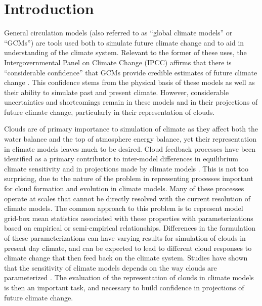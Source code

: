 \chapter{Introduction}
General circulation models (also referred to as ``global climate models'' or ``GCMs'') are tools used both to simulate future climate change and to aid in understanding of the climate system. Relevant to the former of these uses, the Intergovernmental Panel on Climate Change (IPCC) affirms that there is ``considerable confidence'' that GCMs provide credible estimates of future climate change \citep{ar4_ch8}. This confidence stems from the physical basis of these models as well as their ability to simulate past and present climate. However, considerable uncertainties and shortcomings remain in these models and in their projections of future climate change, particularly in their representation of clouds.

Clouds are of primary importance to simulation of climate as they affect both the water balance and the top of atmosphere energy balance, yet their representation in climate models leaves much to be desired. Cloud feedback processes have been identified as a primary contributor to inter-model differences in equilibrium climate sensitivity and in projections made by climate models \citep{cess_et_al_1990,colman_2003,stephens_2005,webb_et_al_2006,bony_et_al_2006,williams_and_webb_2009}. This is not too surprising, due to the nature of the problem in representing processes important for cloud formation and evolution in climate models. Many of these processes operate at scales that cannot be directly resolved with the current resolution of climate models. The common approach to this problem is to represent model grid-box mean statistics associated with these properties with parameterizations based on empirical or semi-empirical relationships. Differences in the formulation of these parameterizations can have varying results for simulation of clouds in present day climate, and can be expected to lead to different cloud responses to climate change that then feed back on the climate system. Studies have shown that the sensitivity of climate models depends on the way clouds are parameterized \citep{mitchell_et_al_1987,senior_and_mitchell_1993,le_treut_et_al_1994,fowler_and_randall_1994,ma_et_al_1994,liang_and_wang_1997,yao_and_del_genio_2002,zhang_2004,stainforth_et_al_2005,yokohata_et_al_2005}. The evaluation of the representation of clouds in climate models is then an important task, and necessary to build confidence in projections of future climate change. 

